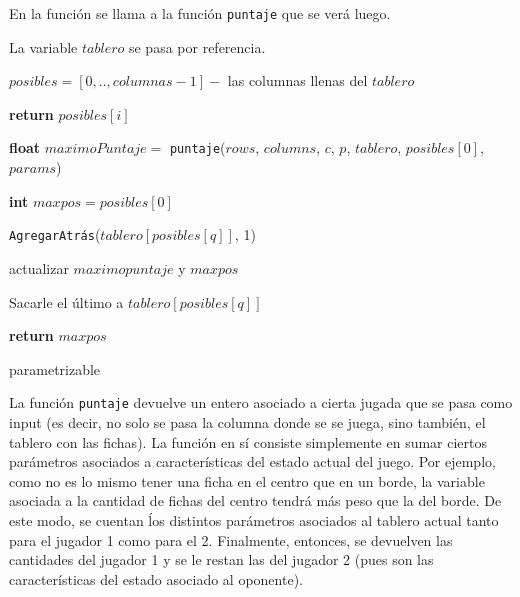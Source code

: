\documentclass[A4paper,oneside,fleqn,11pt]{article}
\theoremstyle{definition}
\begin{document}
En la función se llama a la función \texttt{puntaje} que se verá luego.

La variable $tablero$ se pasa por referencia.
\begin{algorithm}


    
    	$posibles = [0,..,columnas-1] -$ las columnas llenas del $tablero$

    	\For{$i \leftarrow [0,..,\lvert posibles \rvert$)}
    		{

    			{
    			\textbf{return} $posibles[i]$
    			}
    		}

    	\textbf{float} $maximoPuntaje =$ \texttt{puntaje}($rows$, $columns$, $c$, $p$, $tablero$, $posibles[0]$, $params$)

    	\textbf{int} $maxpos = posibles[0]$
    	
    	\For{$q \leftarrow [1,..,\lvert posibles \rvert$)}
    		{

			\texttt{AgregarAtrás}($tablero[posibles[q]]$, 1)

				{
				actualizar $maximopuntaje$ y $maxpos$
				}

			Sacarle el último a $tablero[posibles[q]]$		
			}

		\textbf{return} $maxpos$
    
    
    \caption{parametrizable}

\end{algorithm}


La función \texttt{puntaje} devuelve un entero asociado a cierta jugada que se pasa como input (es decir, no solo se pasa la columna donde se se juega, sino también, el tablero con las fichas). La función en sí consiste simplemente en sumar ciertos parámetros asociados a características del estado actual del juego. Por ejemplo, como no es lo mismo tener una ficha en el centro que en un borde, la variable asociada a la cantidad de fichas del centro tendrá más peso que la del borde. De este modo, se cuentan ĺos distintos parámetros asociados al tablero actual tanto para el jugador 1 como para el 2. Finalmente, entonces, se devuelven las cantidades del jugador 1 y se le restan las del jugador 2 (pues son las características del estado asociado al oponente).
\end{document}

